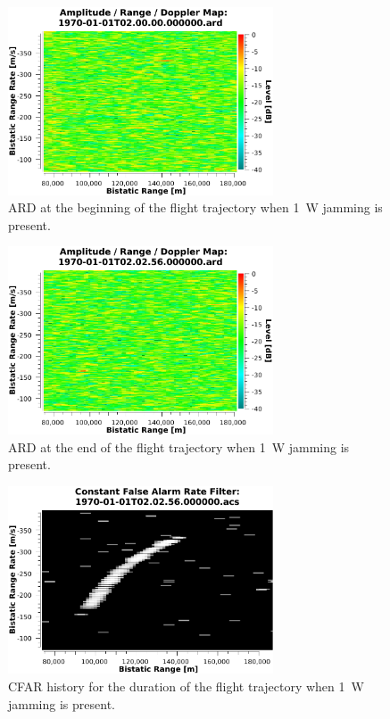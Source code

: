 \documentclass[english, 12pt]{report}
\begin{document}
\begin{figure}[htbp]
\begin{center}
\includegraphics[width=0.7\textwidth]{figs/Simulations/1WJammingARDFirst.pdf}
\caption{ARD at the beginning of the flight trajectory when 1~W jamming is present.}
\label{fig:1WJammingARDFirst}
\end{center}
\end{figure}

\begin{figure}[htbp]
\begin{center}
\includegraphics[width=0.7\textwidth]{figs/Simulations/1WJammingARDLast.pdf}
\caption{ARD at the end of the flight trajectory when 1~W jamming is present.}
\label{fig:1WJammingARDLast}
\end{center}
\end{figure}

\begin{figure}[htbp]
\begin{center}
\includegraphics[width=0.7\textwidth]{figs/Simulations/1WJammingCFAR.pdf}
\caption{CFAR history for the duration of the flight trajectory when 1~W jamming is present.}
\label{fig:1WJammingARDCFAR}
\end{center}
\end{figure}
\end{document}
